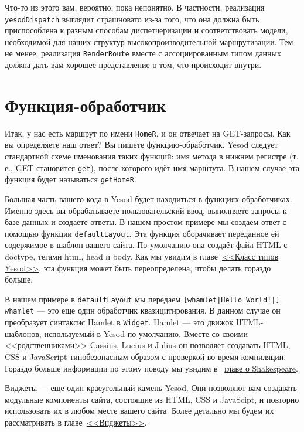 Что-то из этого вам, вероятно, пока непонятно. В частности, реализация
\lstinline!yesodDispatch! выглядит страшновато из-за того, что она должна быть
приспособлена к разным способам диспетчеризации и соответствовать модели, необходимой для
наших структур высокопроизводительной маршрутизации. Тем не менее, реализация
\lstinline!RenderRoute! вместе с ассоциированным типом данных должна дать вам хорошее
представление о том, что происходит внутри.

\section{Функция-обработчик}

Итак, у нас есть маршрут по имени \lstinline!HomeR!, и он отвечает на GET-запросы.  Как вы
определяете наш ответ? Вы пишете функцию-обработчик. Yesod следует стандартной схеме
именования таких функций: имя метода в нижнем регистре (т. е., GET становится
\lstinline!get!), после которого идёт имя марштута. В нашем случае эта функция будет
называться \lstinline!getHomeR!.

Большая часть вашего кода в Yesod будет находиться в функциях-обработчиках.  Именно здесь
вы обрабатываете пользовательский ввод, выполняете запросы к базе данных и создаете
ответы. В нашем простом примере мы создаем ответ с помощью функции
\lstinline!defaultLayout!. Эта функция оборачивает переданное ей содержимое в шаблон
вашего сайта. По умолчанию она создаёт файл HTML с doctype, тегами html, head и body. Как
мы увидим в главе~\hyperref[ch:yesod-typeclass]{<<Класс типов Yesod>>}, эта функция может
быть переопределена, чтобы делать гораздо больше.

В нашем примере в \lstinline!defaultLayout! мы передаем
\lstinline'[whamlet|Hello World!|]'. \lstinline!whamlet! --- это еще один обработчик
квазицитирования. В данном случае он преобразует синтаксис Hamlet в
\texttt{Widget}. Hamlet --- это движок HTML-шаблонов, используемый в Yesod по умолчанию.
Вместе со своими <<родственниками>> Cassius, Lucius и Julius он позволяет создавать HTML,
CSS и JavaScript типобезопасным образом с проверкой во время компиляции. Гораздо больше
информации по этому поводу мы увидим в ~\hyperref[ch:shakespeare]{главе о Shakespeare}.

Виджеты --- еще один краеугольный камень Yesod. Они позволяют вам создавать
модульные компоненты сайта, состоящие из HTML, CSS и JavaScipt,
и повторно использовать их в любом месте вашего сайта. Более детально мы будем их
рассматривать в главе~\hyperref[ch:widgets]{<<Виджеты>>}.

